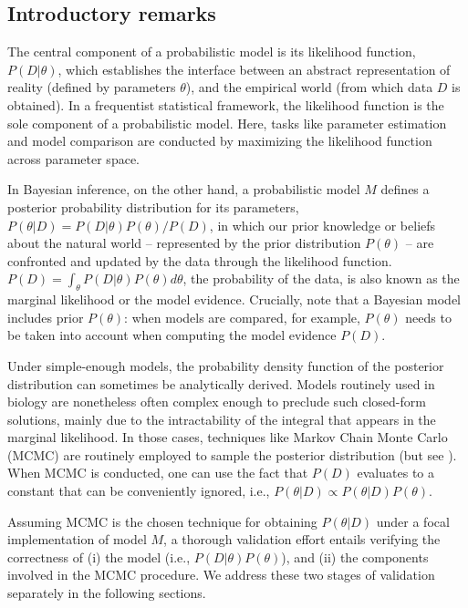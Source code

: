 \documentclass[oneside]{article}
\begin{document}
\subsection*{Introductory remarks}

The central component of a probabilistic model is its likelihood
function, $P(D|\theta)$, which establishes the
interface between an abstract representation of reality (defined by parameters $\theta$), and the
empirical world (from which data $D$ is obtained).
In a frequentist statistical framework, the likelihood function is the sole
component of a probabilistic model.
Here, tasks like parameter estimation and model comparison are conducted
by maximizing the likelihood function across parameter
space.

In Bayesian inference, on the other hand, a probabilistic model $M$
defines a posterior probability distribution for its parameters,
$P(\theta|D) = P(D|\theta)P(\theta) / P(D)$, in which our prior
knowledge or beliefs about the natural world -- represented by the prior
distribution $P(\theta)$ -- are confronted and updated by the data through the
likelihood function.
$P(D) = \int_\theta P(D|\theta)P(\theta)d\theta$, the probability of
the data, is also known as the marginal likelihood or the model
evidence.
Crucially, note that a Bayesian model includes prior $P(\theta)$:
when models are compared, for example, $P(\theta)$ needs to be taken
into account when computing the model evidence $P(D)$.

Under simple-enough models, the probability density function of the posterior distribution can sometimes be analytically
derived.
Models routinely used in biology are nonetheless often complex enough
to preclude such closed-form solutions, mainly due to the
intractability of the integral that appears in the marginal
likelihood.
In those cases, techniques like Markov Chain Monte Carlo (MCMC) are
routinely employed to sample the posterior distribution (but see
{\color{red}{citation for HMC}} \citealt{zhang18}).
When MCMC is conducted, one can use the fact that $P(D)$
evaluates to a constant that can be conveniently ignored, i.e., $P(\theta|D) \propto P(\theta|D)P(\theta)$.

Assuming MCMC is the chosen technique for obtaining $P(\theta|D)$
under a focal implementation of model $M$,
a thorough validation effort entails verifying the
correctness of (i) the model (i.e., $P(D|\theta)P(\theta)$), and (ii)
the components involved in the MCMC procedure.
We address these two stages of validation separately in the following sections.
\end{document}
